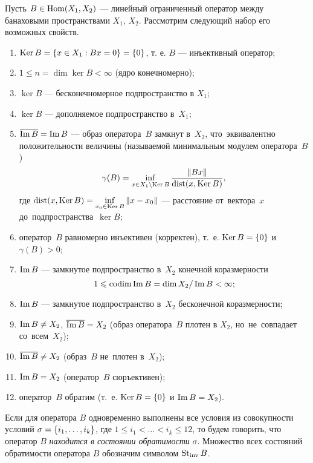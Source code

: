 \begin{definition}\label{def:stinv}
    Пусть $B \in \operatorname{Hom}(X_1, X_2)$ --- линейный ограниченный оператор между банаховыми пространствами $X_1$, $X_2$. Рассмотрим следующий набор его возможных свойств.
    \begin{enumerate}[label={\arabic*)}]
        \setlength\itemsep{0em}
        \item $\operatorname{Ker} B = \left\{x \in X_1 : Bx = 0\right\} = \left\{0\right\}$, т. е. $B$ --- инъективный оператор;
        \item $1 \leq n = \dim \ker B < \infty$ (ядро конечномерно);
        \item $\ker B$ --- бесконечномерное подпространство в $X_1$;
        \item $\ker B$ --- дополняемое подпространство в~$X_1$;
        \item $\overline{\operatorname{Im} B} = \operatorname{Im} B$ --- образ оператора~$B$ замкнут в~$X_2$, что~эквивалентно положительности величины (называемой минимальным модулем оператора~$B$)
        \[ \gamma(B) = \inf_{x \in X_1 \setminus \operatorname{Ker} B} \frac{\left\|Bx\right\|}{\operatorname{dist} (x, \operatorname{Ker} B)}, \]
        где $\operatorname{dist} (x, \operatorname{Ker} B) = \inf\limits_{x_0 \in \operatorname{Ker} B} \left\|x - x_0\right\|$ --- расстояние от~вектора~$x$ до~подпространства~$\ker B$;
        \item оператор~$B$ равномерно инъективен (корректен), т.~е. $\operatorname{Ker} B = \left\{0\right\}$ и~$\gamma(B) > 0$;
        \item $\operatorname{Im} B$ --- замкнутое подпространство в~$X_2$ конечной коразмерности
        \[ 1 \leqslant \operatorname{codim} \operatorname{Im} B = \dim X_2 / \operatorname{Im} B < \infty; \]
        \item $\operatorname{Im} B$ --- замкнутое подпространство в~$X_2$ бесконечной коразмерности;
        \item $\operatorname{Im} B \neq X_2$, $\overline{\operatorname{Im} B} = X_2$ (образ оператора~$B$ плотен в $X_2$, но~не~совпадает со~всем~$X_2$);
        \item $\overline{\operatorname{Im} B} \neq X_2$ (образ~$B$ не~плотен в~$X_2$);
        \item $\operatorname{Im} B = X_2$ (оператор~$B$ сюръективен);
        \item оператор~$B$ обратим (т.~е. $\operatorname{Ker} B = \left\{0\right\}$ и $\operatorname{Im} B = X_2$).
    \end{enumerate}
    Если для оператора $B$ одновременно выполнены все условия из совокупности условий $\sigma \hm= \menge{i_1, \dotsc, i_k}$, где $1 \leq i_1 < \dotsc < i_k \leq 12$, то будем говорить, что оператор $B$ \emph{находится в состоянии обратимости} $\sigma$. Множество всех состояний обратимости оператора $B$ обозначим символом $\operatorname{St_{inv}} B$.
\end{definition}

